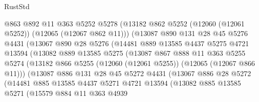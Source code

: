 \begin{lexlean}{RustStd}
\begin{coremodule}
                      @863
                      @892
                      @11
                      @363
                      @5252
                      @5278
                      (@13182 @862 @5252 (@12060 (@12061 @5252)) (@12065 (@12067 @862 @11)))
                      (@13087
                        @890
                        @131
                        @28
                        @45
                        @5276
                        @4431
                        (@13067
                          @890
                          @28
                          @5276
                          (@14481
                            @889
                            @13585
                            @4437
                            @5275
                            @4721
                            @13594
                            (@13082
                              @889
                              @13585
                              @5275
                              (@13087
                                @867
                                @888
                                @11
                                @363
                                @5255
                                @5274
                                (@13182
                                  @866
                                  @5255
                                  (@12060 (@12061 @5255))
                                  (@12065 (@12067 @866 @11)))
                                (@13087
                                  @886
                                  @131
                                  @28
                                  @45
                                  @5272
                                  @4431
                                  (@13067
                                    @886
                                    @28
                                    @5272
                                    (@14481
                                      @885
                                      @13585
                                      @4437
                                      @5271
                                      @4721
                                      @13594
                                      (@13082
                                        @885
                                        @13585
                                        @5271
                                        (@15579
                                          @884
                                          @11
                                          @363
                                          @4939

\end{coremodule}
\end{lexlean}
